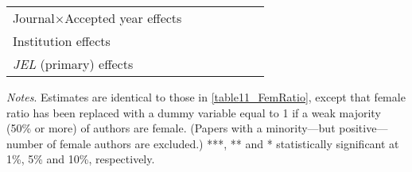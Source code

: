 \begin{table}
\begin{threeparttable}
\begin{tabular}{p{3.78cm}S@{}S@{}S@{}S@{}S@{}S@{}}
            Journal\(\times\)Accepted year effects &               &               &           {}   &               &               &           {}   \\
            Institution effects           &           {}   &           {}   &           {}   &           {}   &           {}   &           {}   \\
            \textit{JEL} (primary) effects&               &               &               &           {}   &           {}   &           {}   \\
            \bottomrule
        \end{tabular}
        \begin{tablenotes}
            \tiny
            \item \textit{Notes}. Estimates are identical to those in \autoref{table11_FemRatio}, except that female ratio has been replaced with a dummy variable equal to 1 if a weak majority (50\% or more) of authors are female. (Papers with a minority---but positive---number of female authors are excluded.) ***, ** and * statistically significant at 1\%, 5\% and 10\%, respectively.
        \end{tablenotes}
    \end{threeparttable}
\end{table}